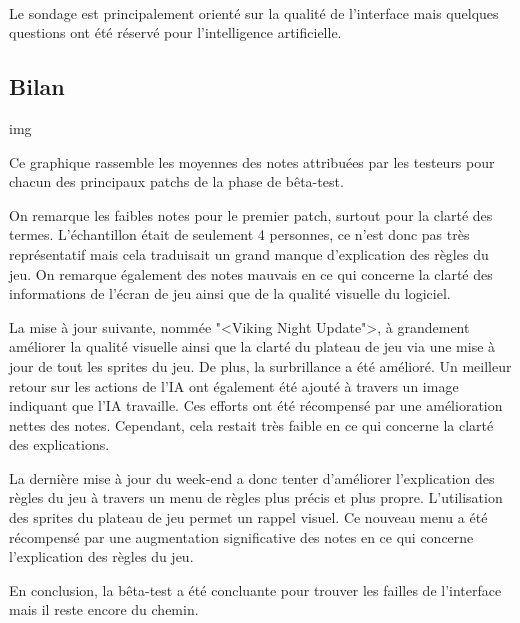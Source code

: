 \documentclass[11pt]{article} %
\begin{document}
\paragraph{}
Le sondage est principalement orienté sur la qualité de l'interface mais quelques questions ont été réservé pour l'intelligence artificielle. 

\subsection{Bilan}

img 

Ce graphique rassemble les moyennes des notes attribuées par les testeurs pour chacun des principaux patchs de la phase de bêta-test. 

On remarque les faibles notes pour le premier patch, surtout pour la clarté des termes. L’échantillon était de seulement 4 personnes, ce n'est donc pas très représentatif mais cela traduisait un grand manque d'explication des règles du jeu. On remarque également des notes mauvais en ce qui concerne la clarté des informations de l’écran de jeu ainsi que de la qualité visuelle du logiciel.

La mise à jour suivante, nommée "<Viking Night Update">, à grandement améliorer la qualité visuelle ainsi que la clarté du plateau de jeu via une mise à jour de tout les sprites du jeu. De plus, la surbrillance a été amélioré. Un meilleur retour sur les actions de l'IA ont également été ajouté à travers un image indiquant que l'IA travaille. Ces efforts ont été récompensé par une amélioration nettes des notes. Cependant, cela restait très faible en ce qui concerne la clarté des explications. 

La dernière mise à jour du week-end a donc tenter d'améliorer l'explication des règles du jeu à travers un menu de règles plus précis et plus propre. L'utilisation des sprites du plateau de jeu permet un rappel visuel. Ce nouveau menu a été récompensé par une augmentation significative des notes en ce qui concerne l'explication des règles du jeu. 

En conclusion, la bêta-test a été concluante pour trouver les failles de l'interface mais il reste encore du chemin.
\end{document}
